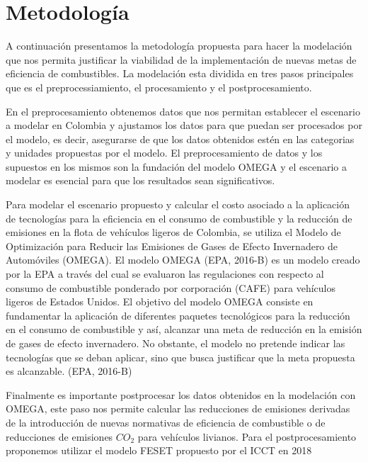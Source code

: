 
\chapter{Metodología}
\label{sec:results}


A continuación presentamos la metodología propuesta para hacer la modelación que nos permita justificar la viabilidad de la implementación de nuevas metas de eficiencia de combustibles. La modelación esta dividida en tres pasos principales que es el preprocessiamiento, el procesamiento y el postprocesamiento.

En el preprocesamiento obtenemos datos que nos permitan establecer el escenario a modelar en Colombia y ajustamos los datos para que puedan ser procesados por el modelo, es decir, asegurarse de que los datos obtenidos estén en las categorias y unidades propuestas por el modelo. El preprocesamiento de datos y los supuestos en los mismos son la fundación del modelo OMEGA y el escenario a modelar es esencial para que los resultados sean significativos.

Para modelar el escenario propuesto y calcular el costo asociado a la aplicación de tecnologías para la eficiencia en el consumo de combustible y la reducción de emisiones en la flota de vehículos ligeros de Colombia, se utiliza el Modelo de Optimización para Reducir las Emisiones de Gases de Efecto Invernadero de Automóviles (OMEGA).  
El modelo OMEGA (EPA, 2016-B) \cite{EPA_2016-B} es un modelo creado por la EPA a través del cual se evaluaron las regulaciones con respecto al consumo de combustible ponderado por corporación (CAFE) para vehículos ligeros de Estados Unidos. El objetivo del modelo OMEGA consiste en fundamentar la aplicación de diferentes paquetes tecnológicos para la reducción en el consumo de combustible y así, alcanzar una meta de reducción en la emisión de gases de efecto invernadero. No obstante, el modelo no pretende indicar las tecnologías que se deban aplicar, sino que busca justificar que la meta propuesta es alcanzable. (EPA, 2016-B) \cite{EPA_2016-B} 

Finalmente es importante postprocesar los datos obtenidos en la modelación con OMEGA, este paso nos permite calcular las reducciones de emisiones derivadas de la introducción de nuevas normativas de eficiencia de combustible o de reducciones de emisiones $CO_2$ para vehículos livianos. Para el postprocesamiento proponemos utilizar el modelo FESET propuesto por el ICCT en 2018 \cite{FESET_ICCT}

